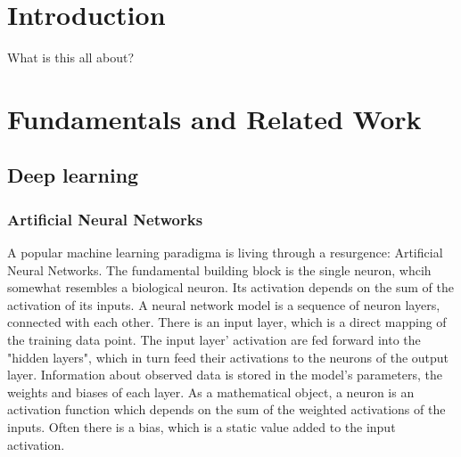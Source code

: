 \documentclass[twoside,12pt,a4paper]{report}
\begin{document}
\tableofcontents

\renewcommand{\baselinestretch}{1}
\small\normalsize

\cleardoublepage


\setcounter{page}{1}


\chapter{Introduction}
What is this all about?


\chapter{Fundamentals and Related Work}

\section{Deep learning}
\subsection{Artificial Neural Networks}
A popular machine learning paradigma is living through a resurgence: Artificial Neural Networks. The fundamental building block is the single neuron, whcih somewhat resembles a biological neuron. Its activation depends on the sum of the activation of its inputs. A neural network model is a sequence of neuron layers, connected with each other. There is an input layer, which is a direct mapping of the training data point. The input layer' activation are fed forward into the "hidden layers", which in turn feed their activations to the neurons of the output layer. Information about observed data is stored in the model's parameters, the weights and biases of each layer.
As a mathematical object, a neuron is an activation function which depends on the sum of the weighted activations of the inputs. Often there is a bias, which is a static value added to the input activation.
\end{document}
